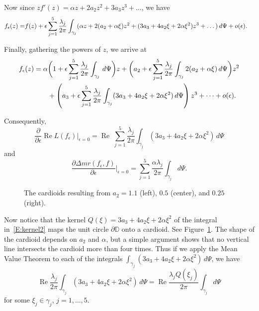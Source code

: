 \documentclass{cmft}
\newcommand{\D}{\mathbb{D}}
\newcommand{\al}{\alpha}
\DeclareMathOperator{\re}{Re}
\begin{document}
Now since $zf'(z)=\alpha z+2a_2 z^2 + 3 a_3 z^3 +\dots$, we have
\begin{align}\notag
f_\epsilon(z) = 
& f(z)+ \epsilon  \sum_{j=1}^5 \frac{\lambda_j}{2\pi} \int_{\gamma_j} 
(\al z + 2(a_2 + \al\xi) z^2 + (3a_3 + 4a_2 \xi +2\al\xi^2)z^3 +\dots) \, d\Psi +
o(\epsilon).
\end{align}


Finally, gathering the powers of $z$, we arrive at
\begin{align}\label{E:fepsilon}
f_\epsilon(z)=\alpha &
\biggl(1+ \epsilon  \sum_{j=1}^5 \frac{\lambda_j}{2\pi} \int_{\gamma_j}
\, d\Psi\biggr) z+
 \biggl(a_2+ \epsilon  \sum_{j=1}^5 \frac{\lambda_j}{2\pi} \int_{\gamma_j}
 2(a_2+\al\xi)\, d\Psi\biggr)z^2\\\notag
& +
\left(a_3+ \epsilon  \sum_{j=1}^5 \frac{\lambda_j}{2\pi} \int_{\gamma_j}
 (3a_3+4a_2\xi+2\al\xi^2) \, d\Psi\right)z^3
+ \dots +o(\epsilon).
\end{align}


Consequently,
\begin{equation}\label{E:kernel2}
\frac{\partial}{\partial \epsilon} \re L(f_\epsilon)\biggr \vert_{\epsilon=0} =
\re \; \sum_{j=1}^5 \frac{\lambda_j}{2\pi} \int_{\gamma_j}
 (3a_3+4a_2\xi+2\al\xi^2) \, d\Psi
\end{equation}
and
\begin{equation}
\frac{\partial\Delta mr (f_\epsilon,f)}{\partial\epsilon}\Biggr\vert_{\epsilon=0}
=  \sum_{j=1}^5 \frac{\alpha \lambda_j}{2\pi} \int_{\gamma_j} d\Psi.
\end{equation}


\begin{figure}
\begin{center}
\caption{The cardioids resulting from $a_2=1.1$ (left), $0.5$ (center), and $0.25$ (right).}
\label{F:kernel2}
\end{center}
\end{figure}

Now notice that the kernel $Q(\xi)=3a_3+4a_2\xi+2\al\xi^2$ of the integral
in~\eqref{E:kernel2} maps the unit circle $\partial\D$ onto a cardioid.
See Figure~\ref{F:kernel2}.  The shape of the cardioid depends on $a_2$ and $\al$,
but a simple argument shows 
that  no vertical line intersects the cardioid more than four
times.  Thus if we apply the Mean Value Theorem to each of the integrals
$\int_{\gamma_j}  (3a_3+4a_2\xi+2\al\xi^2) \, d\Psi$, we have
\[
\re \frac{\lambda_j}{2\pi} \int_{\gamma_j}
 (3a_3+4a_2\xi+2\al\xi^2) \, d\Psi = \re \frac{ \lambda_j Q(\xi_j)}{2\pi}
\int_{\gamma_j} d\Psi
\]
for some $\xi_j\in\gamma_j$, $j=1,\dots,5$.
\end{document}
